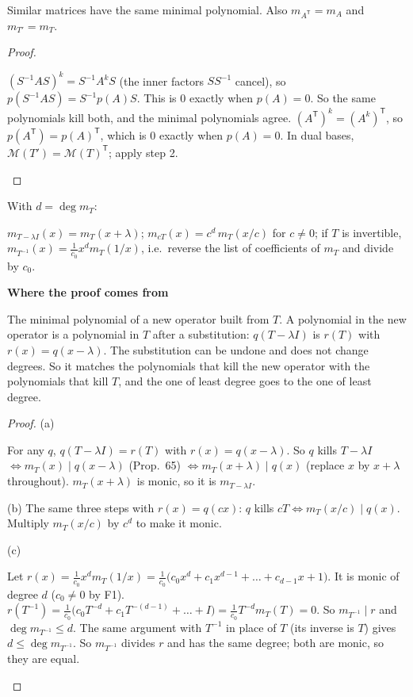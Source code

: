 \documentclass[10pt]{scrartcl}
\newcommand{\MM}{\mathcal M}
\newenvironment{motive}{\begin{mdframed}[style=thinkbox]\textbf{\color{OliveGreen!75!black}Where the proof comes from}\begin{description}[leftmargin=0.9em,labelindent=0pt,itemsep=2pt,topsep=2pt,font=\normalfont\bfseries\color{OliveGreen!70!black}]}{\end{description}\end{mdframed}}
\newenvironment{steps}{\begin{enumerate}[label=\arabic*.,leftmargin=1.5em,itemsep=2pt,topsep=2pt]}{\end{enumerate}}
\begin{document}
\begin{proposition*}
  Similar matrices have the same minimal polynomial. Also $m_{A^{\mathsf T}}=m_A$ and $m_{T'}=m_T$.
\end{proposition*}
\begin{proof}
  \begin{steps}
    \ii $(S^{-1}AS)^k=S^{-1}A^kS$ (the inner factors $SS^{-1}$ cancel), so $p(S^{-1}AS)=S^{-1}p(A)S$. This is $0$ exactly when $p(A)=0$. So the same polynomials kill both, and the minimal polynomials agree.
    \ii $(A^{\mathsf T})^k=(A^k)^{\mathsf T}$, so $p(A^{\mathsf T})=p(A)^{\mathsf T}$, which is $0$ exactly when $p(A)=0$.
    \ii In dual bases, $\MM(T')=\MM(T)^{\mathsf T}$; apply step 2.
  \end{steps}
\end{proof}

\begin{proposition*}
  With $d=\deg m_T$:
  \begin{enumerate}[(a)]
    \ii $m_{T-\lambda I}(x)=m_T(x+\lambda)$;
    \ii $m_{cT}(x)=c^d\,m_T(x/c)$ for $c\ne0$;
    \ii if $T$ is invertible, $m_{T^{-1}}(x)=\frac1{c_0}x^dm_T(1/x)$, i.e.\ reverse the list of coefficients of $m_T$ and divide by $c_0$.
  \end{enumerate}
\end{proposition*}
\begin{motive}
  \ii[Want.] The minimal polynomial of a new operator built from $T$.
  \ii[Know.] A polynomial in the new operator is a polynomial in $T$ after a substitution: $q(T-\lambda I)$ is $r(T)$ with $r(x)=q(x-\lambda)$.
   The substitution can be undone and does not change degrees. So it matches the polynomials that kill the new operator with the polynomials that kill $T$, and the one of least degree goes to the one of least degree.
\end{motive}
\begin{proof}
  (a)
  \begin{steps}
    \ii For any $q$, $q(T-\lambda I)=r(T)$ with $r(x)=q(x-\lambda)$.
    \ii So $q$ kills $T-\lambda I$ $\iff m_T(x)\mid q(x-\lambda)$ (Prop.~65) $\iff m_T(x+\lambda)\mid q(x)$ (replace $x$ by $x+\lambda$ throughout).
    \ii $m_T(x+\lambda)$ is monic, so it is $m_{T-\lambda I}$.
  \end{steps}
  (b) The same three steps with $r(x)=q(cx)$: $q$ kills $cT\iff m_T(x/c)\mid q(x)$. Multiply $m_T(x/c)$ by $c^d$ to make it monic.

  (c)
  \begin{steps}
    \ii Let $r(x)=\frac1{c_0}x^dm_T(1/x)=\frac1{c_0}\bigl(c_0x^d+c_1x^{d-1}+\dots+c_{d-1}x+1\bigr)$. It is monic of degree $d$ ($c_0\ne0$ by F1).
    \ii $r(T^{-1})=\frac1{c_0}\bigl(c_0T^{-d}+c_1T^{-(d-1)}+\dots+I\bigr)=\frac1{c_0}T^{-d}m_T(T)=0$. So $m_{T^{-1}}\mid r$ and $\deg m_{T^{-1}}\le d$.
    \ii The same argument with $T^{-1}$ in place of $T$ (its inverse is $T$) gives $d\le\deg m_{T^{-1}}$.
    \ii So $m_{T^{-1}}$ divides $r$ and has the same degree; both are monic, so they are equal.
  \end{steps}
\end{proof}
\end{document}
